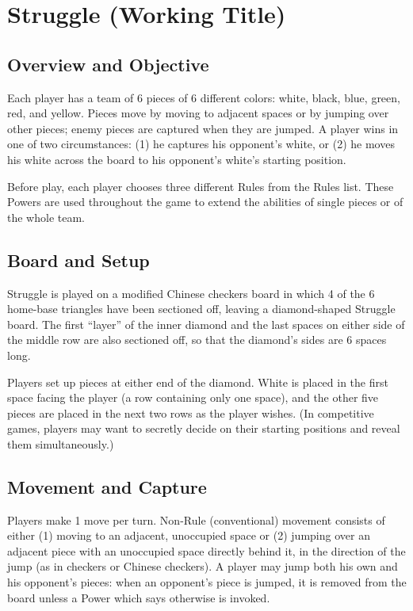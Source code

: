 \documentclass[../rulebook.tex]{subfiles}
\begin{document}
\section*{Struggle (Working Title)}
\subsection*{Overview and Objective}
Each player has a team of 6 pieces of 6 different colors:
white, black, blue, green, red, and yellow.
Pieces move by moving to adjacent spaces or by jumping over other pieces;
enemy pieces are captured when they are jumped.
A player wins in one of two circumstances:
(1) he captures his opponent’s white,
or (2) he moves his white across the board to his opponent’s
white’s starting position. 

Before play, each player chooses three different Rules
from the Rules list.
These Powers are used throughout the game to extend the abilities
of single pieces or of the whole team. 

\subsection*{Board and Setup}
Struggle is played on a modified Chinese checkers board in which 4 of the 6 home-base triangles have been sectioned off, leaving a diamond-shaped Struggle board.  The first “layer” of the inner diamond and the last spaces on either side of the middle row are also sectioned off, so that the diamond’s sides are 6 spaces long.


Players set up pieces at either end of the diamond.
White is placed in the first space facing the player
(a row containing only one space),
and the other five pieces are placed in the next two rows
as the player wishes. (In competitive games, players may want to secretly
decide on their starting positions and reveal them simultaneously.)

\subsection*{Movement and Capture}
Players make 1 move per turn.
Non-Rule (conventional) movement consists of either
(1) moving to an adjacent, unoccupied space or
(2) jumping over an adjacent piece with an unoccupied
space directly behind it, in the direction of the jump
(as in checkers or Chinese checkers).
A player may jump both his own and his opponent’s pieces:
when an opponent’s piece is jumped, it is removed from the board
unless a Power which says otherwise is invoked.
\end{document}
